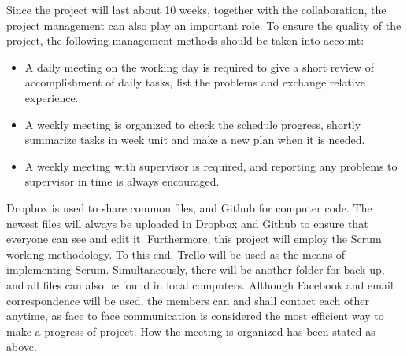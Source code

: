 Since the project will last about 10 weeks, together with the collaboration,
the project management can also play an important role. To ensure the quality of
the project, the following management methods should be taken into account:

\begin{itemize}
  \item A daily meeting on the working day is required to give a short review of
    accomplishment of daily tasks, list the problems and exchange relative
    experience.
  \item A weekly meeting is organized to check the schedule progress, shortly
    summarize tasks in week unit and make a new plan when it is needed.
  \item A weekly meeting with supervisor is required, and reporting any problems
    to supervisor in time is always encouraged.
\end{itemize}

Dropbox is used to share common files, and Github for computer code. The
newest files will always be uploaded in Dropbox and Github to ensure that everyone
can see and edit it. Furthermore, this project will employ the Scrum working
methodology. To this end, Trello will be used as the means of implementing
Scrum. Simultaneously, there will be another folder for back-up,
and all files can also be found in local computers. Although Facebook and email
correspondence will be used, the members can and shall contact each other
anytime, as face to face communication is considered the most efficient way to
make a progress of project. How the meeting is organized has been stated as above.
